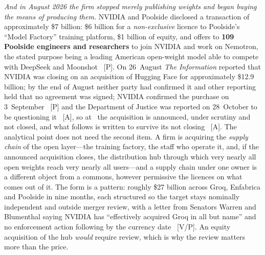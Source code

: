 \emph{And in August 2026 the firm stopped merely publishing weights and began buying the means of producing them.} NVIDIA and Poolside disclosed a transaction of approximately \$7 billion: \$6 billion for a \emph{non-exclusive} licence to Poolside's ``Model Factory'' training platform, \$1 billion of equity, and offers to \textbf{109 Poolside engineers and researchers} to join NVIDIA and work on Nemotron, the stated purpose being a leading American open-weight model able to compete with DeepSeek and Moonshot~\cite{nvda-poolside} [P]. On 26~August \emph{The Information} reported that NVIDIA was closing on an acquisition of Hugging Face for approximately \$12.9 billion; by the end of August neither party had confirmed it and other reporting held that no agreement was signed; NVIDIA confirmed the purchase on 3~September~\cite{mdl-nvda-hf-confirm} [P] and the Department of Justice was reported on 28~October to be questioning it~\cite{mdl-doj-hf} [A], so at \datafreeze\ the acquisition is announced, under scrutiny and not closed, and what follows is written to survive its not closing~\cite{nvda-hf} [A]. The analytical point does not need the second item. A firm is acquiring the \emph{supply chain} of the open layer---the training factory, the staff who operate it, and, if the announced acquisition closes, the distribution hub through which very nearly all open weights reach very nearly all users---and a supply chain under one owner is a different object from a commons, however permissive the licences on what comes out of it. The form is a pattern: roughly \$27 billion across Groq, Enfabrica and Poolside in nine months, each structured so the target stays nominally independent and outside merger review, with a letter from Senators Warren and Blumenthal saying NVIDIA has ``effectively acquired Groq in all but name'' and no enforcement action following by the currency date~\cite{nvda-structured} [V/P]. An equity acquisition of the hub \emph{would} require review, which is why the review matters more than the price.

